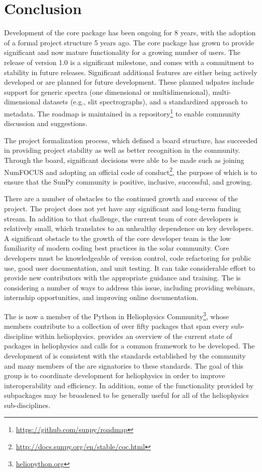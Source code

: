 \section{Conclusion}
\label{sec:conclusion}

Development of the \sunpypkg core package has been ongoing for 8 years, with the adoption of a formal project structure 5 years ago.
The core package has grown to provide significant and now mature functionality for a growing number of users.
The release of version 1.0 is a significant milestone, and comes with a commitment to stability in future releases.
Significant additional features are either being actively developed or are planned for future development.
These planned udpates include support for generic spectra (one dimensional or multidimensional), multi-dimensional datasets (e.g., slit spectrographs), and a standardized approach to metadata. The roadmap is maintained in a repository\footnote{\url{https://github.com/sunpy/roadmap}} to enable community discussion and suggestions.

The project formalization process, which defined a board structure, has succeeded in providing project stability as well as better recognition in the community.
Through the board, significant decisions were able to be made such as joining NumFOCUS and adopting an official code of conduct\footnote{\url{http://docs.sunpy.org/en/stable/coc.html}}, the purpose of which is to ensure that the SunPy community is positive, inclusive, successful, and growing.

There are a number of obstacles to the continued growth and success of the project.
The project does not yet have any significant and long-term funding stream.
In addition to that challenge, the current team of core developers is relatively small, which translates to an unhealthy dependence on key developers.
A significant obstacle to the growth of the core developer team is the low familiarity of modern coding best practices in the solar community.
Core developers must be knowledgeable of version control, code refactoring for public use, good user documentation, and unit testing.
It can take considerable effort to provide new contributors with the appropriate guidance and training.
The \sunpyproj is considering a number of ways to address this issue, including providing webinars, internship opportunities, and improving online documentation.

The \sunpyproj is now a member of the Python in Heliophysics Community\footnote{\url{heliopython.org}}, whose members contribute to a collection of over fifty \python packages that span every sub-discipline within heliophysics.
\citet{snakes} provides an overview of the current state of \python packages in heliophysics and calls for a common framework to be developed.
The development of \sunpypkg is consistent with the standards established by the community \citep{pyhcStandards} and many members of the \sunpyproj are signatories to these standards.
The goal of this group is to coordinate \python development for heliophysics in order to improve interoperability and efficiency.
In addition, some of the functionality provided by \sunpypkg subpackages may be broadened to be generally useful for all of the heliophysics sub-disciplines.
